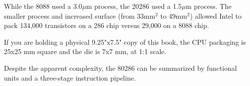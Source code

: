 \documentclass[book.tex]{subfiles}
\begin{document}
\par
While the 8088 used a 3.0$\mu$m process, the 20286 used a 1.5$\mu$m process. The smaller process and increased surface (from 33mm$^2$ to 49mm$^2$) allowed Intel to pack 134,000 transistors on a 286 chip versus 29,000 on a 8088 chip.\\

\par
If you are holding a physical 9.25"x7.5" copy of this book, the CPU packaging is 25x25
mm square and the die is 7x7 mm, at 1:1 scale.\\


\par \vspace{-1pt}
\begin{minipage}{0.48\textwidth}
\centering
{} 

\end{minipage}
\hfill
\begin{minipage}{0.48\textwidth}
\centering
{}
\end{minipage}



 \pagebreak

\par Despite the apparent complexity, the 80286 can be summarized by functional units and a three-stage instruction pipeline.
\end{document}

